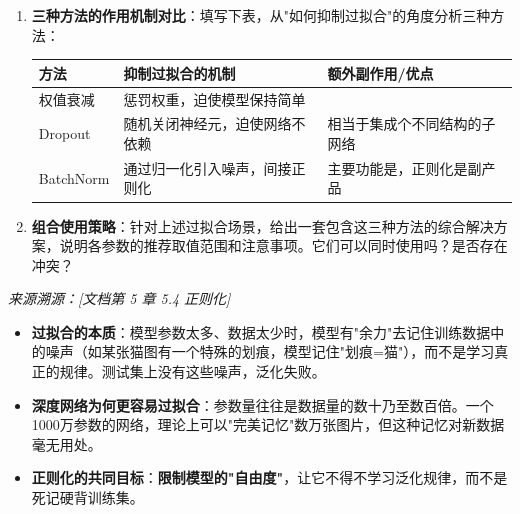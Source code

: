 \documentclass[a4paper,11pt]{ctexart}
\begin{document}
\begin{problembox}
\begin{enumerate}[(1)]
\begin{lstlisting}[language=Python]
# 验证
for x_val, y_val in val_loader:
    pred_val = model(x_val)   # 错误：此处 Dropout 仍在生效
    val_loss = criterion(pred_val, y_val)
        \end{lstlisting}

        \item \textbf{三种方法的作用机制对比}：填写下表，从"如何抑制过拟合"的角度分析三种方法：

        \begin{center}
        \begin{tabular}{p{2.5cm} p{4.5cm} p{4.0cm}}
            \toprule
            方法 & 抑制过拟合的机制 & 额外副作用/优点 \\
            \midrule
            权值衰减 & 惩罚\underline{\hspace{2cm}}权重，迫使模型保持简单 & \underline{\hspace{3.5cm}} \\[1.5em]
            Dropout & 随机关闭神经元，迫使网络不依赖\underline{\hspace{1.5cm}} & 相当于集成\underline{\hspace{1.5cm}}个不同结构的子网络 \\[1.5em]
            BatchNorm & 通过归一化引入\underline{\hspace{1.5cm}}噪声，间接正则化 & 主要功能是\underline{\hspace{2cm}}，正则化是副产品 \\
            \bottomrule
        \end{tabular}
        \end{center}

        \item \textbf{组合使用策略}：针对上述过拟合场景，给出一套包含这三种方法的综合解决方案，说明各参数的推荐取值范围和注意事项。它们可以同时使用吗？是否存在冲突？
    \end{enumerate}

    \vspace{0.2cm}
    {\color{gray}\small\textit{来源溯源：[文档第 5 章 5.4 正则化]}}
\end{problembox}

\begin{beginnerbox}
    \begin{itemize}
        \item \textbf{过拟合的本质}：模型参数太多、数据太少时，模型有"余力"去记住训练数据中的噪声（如某张猫图有一个特殊的划痕，模型记住"划痕=猫"），而不是学习真正的规律。测试集上没有这些噪声，泛化失败。
        \item \textbf{深度网络为何更容易过拟合}：参数量往往是数据量的数十乃至数百倍。一个1000万参数的网络，理论上可以"完美记忆"数万张图片，但这种记忆对新数据毫无用处。
        \item \textbf{正则化的共同目标}：\textbf{限制模型的"自由度"}，让它不得不学习泛化规律，而不是死记硬背训练集。
    \end{itemize}
\end{beginnerbox}
\end{document}
